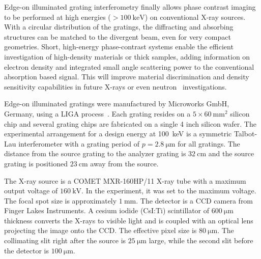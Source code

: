 \documentclass{pnastwo}
\begin{document}
\begin{article}
Edge-on illuminated grating interferometry finally allows phase contrast
imaging to be performed at high energies ($>\SI{100}{\kilo\eV}$) on conventional X-ray
sources. With a circular distribution of the gratings, the diffracting and
absorbing structures can be matched to the divergent beam, even for very
compact geometries. Short, high-energy phase-contrast systems enable the
efficient investigation of high-density materials or thick samples,
adding information on electron density and integrated small angle scattering
power to the conventional absorption based signal. This will improve
material discrimination and density sensitivity capabilities in future
X-rays or even neutron~\cite{Grunzweig2008} investigations.



\begin{materials}
Edge-on illuminated gratings were manufactured by Microworks GmbH, Germany, using a LIGA process~\cite{Kenntner2010}. Each grating
resides on a $5 \times \SI{60}{\milli\metre^2}$ silicon chip and several
grating chips are fabricated on a single 4 inch silicon wafer. The
experimental arrangement for a design energy at \SI{100}{\kilo\electronvolt}
is a symmetric Talbot-Lau interferometer with a grating period of $p =
\SI{2.8}{\micro \metre}$ for all gratings. The distance from the source
grating to the analyzer grating is $\SI{32}{\centi\metre}$ and the source
grating is positioned $\SI{23}{\centi\metre}$ away from the source.

The X-ray source is a COMET MXR-160HP/11 X-ray tube with a maximum output
voltage of $\SI{160}{\kilo\volt}$. In the experiment, it was set to the
maximum voltage. The focal spot size is approximately
$\SI{1}{\milli\metre}$. The detector is a CCD camera from Finger Lakes
Instruments. A cesium iodide (CsI:Ti) scintillator of $\SI{600}{\micro
\metre}$ thickness converts the X-rays to visible light and is coupled with
an optical lens projecting the image onto the CCD. The effective pixel size
is $\SI{80}{\micro \metre}$. The collimating slit right after the source is 
$\SI{25}{\micro \metre}$ large, while the second slit before the detector is
$\SI{100}{\micro\metre}$.


\end{materials}
\end{article}
\end{document}
